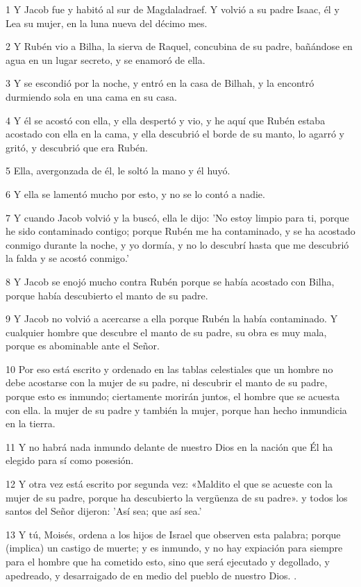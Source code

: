 \par 1 Y Jacob fue y habitó al sur de Magdaladraef. Y volvió a su padre Isaac, él y Lea su mujer, en la luna nueva del décimo mes.
\par 2 Y Rubén vio a Bilha, la sierva de Raquel, concubina de su padre, bañándose en agua en un lugar secreto, y se enamoró de ella.
\par 3 Y se escondió por la noche, y entró en la casa de Bilhah, y la encontró durmiendo sola en una cama en su casa.
\par 4 Y él se acostó con ella, y ella despertó y vio, y he aquí que Rubén estaba acostado con ella en la cama, y ​​ella descubrió el borde de su manto, lo agarró y gritó, y descubrió que era Rubén.
\par 5 Ella, avergonzada de él, le soltó la mano y él huyó.
\par 6 Y ella se lamentó mucho por esto, y no se lo contó a nadie.
\par 7 Y cuando Jacob volvió y la buscó, ella le dijo: 'No estoy limpio para ti, porque he sido contaminado contigo; porque Rubén me ha contaminado, y se ha acostado conmigo durante la noche, y yo dormía, y no lo descubrí hasta que me descubrió la falda y se acostó conmigo.'
\par 8 Y Jacob se enojó mucho contra Rubén porque se había acostado con Bilha, porque había descubierto el manto de su padre.
\par 9 Y Jacob no volvió a acercarse a ella porque Rubén la había contaminado. Y cualquier hombre que descubre el manto de su padre, su obra es muy mala, porque es abominable ante el Señor.
\par 10 Por eso está escrito y ordenado en las tablas celestiales que un hombre no debe acostarse con la mujer de su padre, ni descubrir el manto de su padre, porque esto es inmundo; ciertamente morirán juntos, el hombre que se acuesta con ella. la mujer de su padre y también la mujer, porque han hecho inmundicia en la tierra.
\par 11 Y no habrá nada inmundo delante de nuestro Dios en la nación que Él ha elegido para sí como posesión.
\par 12 Y otra vez está escrito por segunda vez: «Maldito el que se acueste con la mujer de su padre, porque ha descubierto la vergüenza de su padre». y todos los santos del Señor dijeron: 'Así sea; que así sea.'
\par 13 Y tú, Moisés, ordena a los hijos de Israel que observen esta palabra; porque (implica) un castigo de muerte; y es inmundo, y no hay expiación para siempre para el hombre que ha cometido esto, sino que será ejecutado y degollado, y apedreado, y desarraigado de en medio del pueblo de nuestro Dios. .
